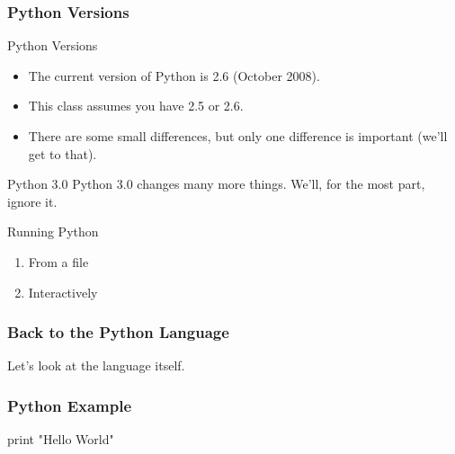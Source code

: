 \begin{frame}
\frametitle{Python Versions}

\begin{block}{Python Versions}
\begin{itemize}
\item The current version of Python is \alert{2.6} (October 2008).
\item This class assumes you have 2.5 or 2.6.
\item There are some small differences, but only one difference is important (we'll get to that).
\end{itemize}
\end{block}

\begin{block}{Python 3.0}
Python 3.0 changes many more things. We'll, for the most part, ignore it.
\end{block}
\end{frame}

\begin{frame}[fragile]

\begin{block}{Running Python}
\begin{enumerate}
\item From a file
\item Interactively
\end{enumerate}
\end{block}

\end{frame}

\begin{frame}[fragile]
\frametitle{Back to the Python Language}
Let's look at the language itself.
\end{frame}

\begin{frame}[fragile]
\frametitle{Python Example}

\begin{python}
print "Hello World"
\end{python}
\end{frame}


